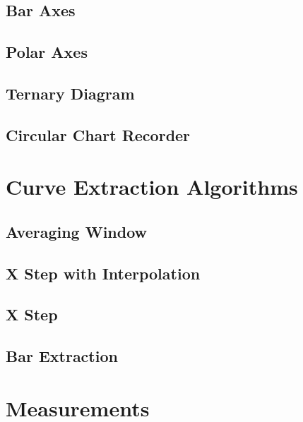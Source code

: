 \documentclass[letterpaper, 11pt]{article}
\begin{document}
\subsection{Bar Axes}
\subsection{Polar Axes}
\subsection{Ternary Diagram}
\subsection{Circular Chart Recorder}

\section{Curve Extraction Algorithms}

\subsection{Averaging Window}
\subsection{X Step with Interpolation}
\subsection{X Step}
\subsection{Bar Extraction}

\section{Measurements}
\end{document}
